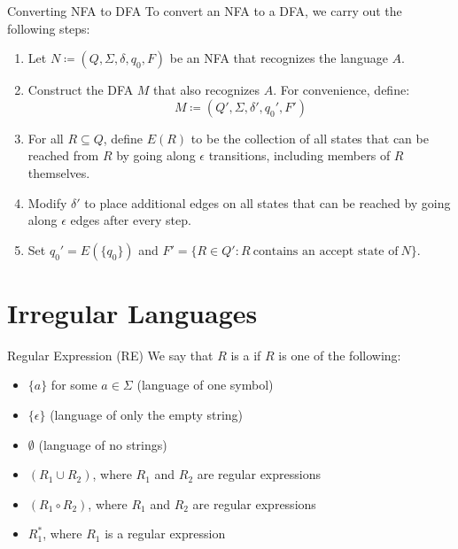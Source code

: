 \begin{tecbox}{Converting NFA to DFA}{}
    To convert an NFA to a DFA, we carry out the following steps:
    \begin{enumerate}
        \item Let $N \coloneq (Q, \Sigma, \delta, q_0, F)$ be an NFA that recognizes the language $A$.
        \item Construct the DFA $M$ that also recognizes $A$. For convenience, define:
        \[ M \coloneq (Q\prime, \Sigma, \delta\prime, q_0\prime, F\prime) \]
        \item For all $R \subseteq Q$, define $E(R)$ to be the collection of all states that can be reached from $R$ by going along $\epsilon$ transitions, including members of $R$ themselves.
        \item Modify $\delta\prime$ to place additional edges on all states that can be reached by going along $\epsilon$ edges after every step.
        \item Set $q_0\prime = E(\{q_0\})$ and $F\prime = \{ R \in Q\prime : R\ \text{contains an accept state of}\ N \}$.
    \end{enumerate}
\end{tecbox}



\section{Irregular Languages}
\begin{dfnbox}{Regular Expression (RE)}{}
    We say that $R$ is a  if $R$ is one of the following:
    \begin{itemize}[noitemsep]
        \item $\{a\}$ for some $a \in \Sigma$ (language of one symbol)
        \item $\{\epsilon\}$ (language of only the empty string)
        \item $\emptyset$ (language of no strings)
        \item $(R_1 \cup R_2)$, where $R_1$ and $R_2$ are regular expressions
        \item $(R_1 \circ R_2)$, where $R_1$ and $R_2$ are regular expressions
        \item $R_1^*$, where $R_1$ is a regular expression
    \end{itemize}
\end{dfnbox}


